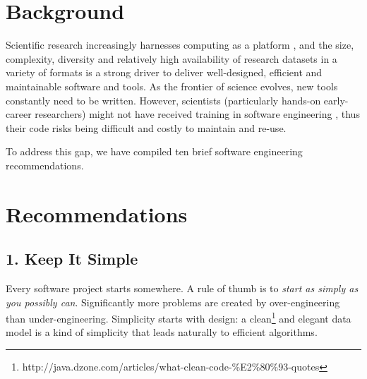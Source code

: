 \documentclass{bmcart}
\begin{document}


\section*{Background}

Scientific research increasingly harnesses computing as a platform \cite{goble2014}, and the size, complexity, diversity and relatively high availability of research datasets in a variety of formats is a strong driver to deliver well-designed, efficient and maintainable software and tools.
As the frontier of science evolves, new tools constantly need to be written. However, scientists (particularly hands-on early-career researchers) might not have received training in software engineering \cite{wilson2014bestpractice}, thus their code risks being difficult and costly to maintain and re-use. 

To address this gap, we have compiled ten brief software engineering recommendations. 

\section*{Recommendations}

\subsection*{1. Keep It Simple}

Every software project starts somewhere. A rule of thumb is to \textit{start as simply as you possibly can}. Significantly more problems are created by over-engineering than under-engineering. Simplicity starts with design: a clean\footnote{http://java.dzone.com/articles/what-clean-code-\%E2\%80\%93-quotes} and elegant data model is a kind of simplicity that leads naturally to efficient algorithms.  
 
\end{document}
